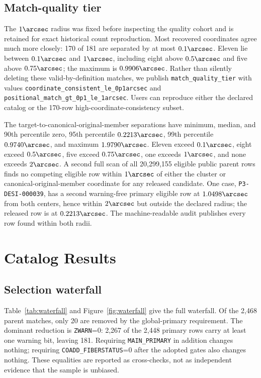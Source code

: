 \documentclass[twocolumn]{aastex701}
\begin{document}
\subsection{Match-quality tier}\label{sec:match-tier}

The $1\arcsec$ radius was fixed before inspecting the quality cohort and is retained for exact
historical count reproduction.  Most recovered coordinates agree much more closely: 170 of 181
are separated by at most $0.1\arcsec$.  Eleven lie between $0.1\arcsec$ and $1\arcsec$, including
eight above $0.5\arcsec$ and five above $0.75\arcsec$; the maximum is $0.9906\arcsec$.  Rather than
silently deleting these valid-by-definition matches, we publish \texttt{match\_quality\_tier} with
values \texttt{coordinate\_consistent\_le\_0p1arcsec} and
\texttt{positional\_match\_gt\_0p1\_le\_1arcsec}.  Users can reproduce either the declared catalog
or the 170-row high-coordinate-consistency subset.

The target-to-canonical-original-member separations have minimum, median, and 90th percentile
zero, 95th percentile $0.2213\arcsec$, 99th percentile $0.9740\arcsec$, and maximum
$1.9790\arcsec$.  Eleven exceed $0.1\arcsec$, eight exceed $0.5\arcsec$, five exceed
$0.75\arcsec$, one exceeds $1\arcsec$, and none exceeds $2\arcsec$.  A second full scan of all
20,299,155 eligible public parent rows finds no competing eligible row within $1\arcsec$ of either
the cluster or canonical-original-member coordinate for any released candidate.  One case,
\texttt{P3-DESI-000039}, has a second warning-free primary eligible row at $1.0498\arcsec$ from
both centers, hence within $2\arcsec$ but outside the declared radius; the released row is at
$0.2213\arcsec$.  The machine-readable audit publishes every row found within both radii.

\section{Catalog Results}\label{sec:results}

\subsection{Selection waterfall}\label{sec:waterfall}

Table~\ref{tab:waterfall} and Figure~\ref{fig:waterfall} give the full waterfall.  Of the 2,468
parent matches, only 20 are removed by the global-primary requirement.  The dominant reduction
is \texttt{ZWARN}=0: 2,267 of the 2,448 primary rows carry at least one warning bit, leaving 181.
Requiring \texttt{MAIN\_PRIMARY} in addition changes nothing; requiring
\texttt{COADD\_FIBERSTATUS}=0 after the adopted gates also changes nothing.  These equalities are
reported as cross-checks, not as independent evidence that the sample is unbiased.
\end{document}
